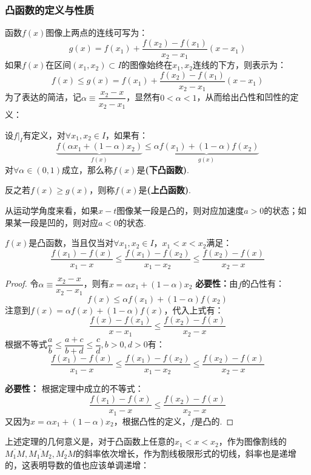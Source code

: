 \subsubsection{凸函数的定义与性质}
函数$f(x)$图像上两点的连线可写为：
\[g(x) = f(x_1) + \frac{f(x_2)-f(x_1)}{x_2-x_1}(x-x_1)\]
如果$f(x)$在区间$(x_1,x_2)\subset I$的图像始终在$x_1,x_2$连线的下方，则表示为：
\[f(x) \leqslant g(x) = f(x_1) + \frac{f(x_2)-f(x_1)}{x_2-x_1}(x-x_1)\]
为了表达的简洁，记$\alpha \equiv \dfrac{x_2-x}{x_2-x_1}$，显然有$0<\alpha<1$，从而给出凸性和凹性的定义：
\begin{definition}
    设$\left.f\right|_{I}$有定义，对$\forall x_1,x_2 \in I$，如果有：
    \[\underbrace{f(\alpha x_1 + (1-\alpha)x_2)}_{f(x)} \leqslant \underbrace{\alpha f(x_1) + (1-\alpha)f(x_2)}_{g(x)}\]
    对$\forall \alpha \in (0,1)$成立，那么称$f(x)$是\textbf{(下凸函数)}.

    反之若$f(x)\geqslant g(x)$，则称$f(x)$是\textbf{(上凸函数)}.
\end{definition}
从运动学角度来看，如果$x-t$图像某一段是凸的，则对应加速度$a>0$的状态；如果某一段是凹的，则对应$a<0$的状态.

\begin{theorem}
    $f(x)$是凸函数，当且仅当对$\forall x_1,x_2 \in I$，$x_1<x<x_2$满足：
    \[\frac{f(x_1)-f(x)}{x_1-x} \leqslant \frac{f(x_1)-f(x_2)}{x_1-x_2} \leqslant \frac{f(x_2)-f(x)}{x_2-x}\]
\end{theorem}

\begin{proof}
    令$\alpha \equiv \dfrac{x_2-x}{x_2-x_1}$，则有$x=\alpha x_1 + (1-\alpha)x_2$
    \textbf{必要性：}由$f$的凸性有：
    \[f(x) \leqslant \alpha f(x_1) + (1-\alpha)f(x_2)\]
    注意到$f(x) = \alpha f(x) + (1-\alpha) f(x)$，代入上式有：
    \[\frac{f(x)-f(x_1)}{x-x_1} \leqslant \frac{f(x_2)-f(x)}{x_2-x}\]
    根据不等式$\dfrac{a}{b} \leqslant \dfrac{a+c}{b+d} \leqslant \dfrac{c}{d},b>0,d>0$有：
    \[\frac{f(x_1)-f(x)}{x_1-x} \leqslant \frac{f(x_1)-f(x_2)}{x_1-x_2} \leqslant \frac{f(x_2)-f(x)}{x_2-x}\]

    \textbf{必要性：}
    根据定理中成立的不等式：
    \[\frac{f(x_1)-f(x)}{x_1-x} \leqslant \frac{f(x_2)-f(x)}{x_2-x}\]
    又因为$x=\alpha x_1 + (1-\alpha)x_2$，根据凸性的定义，$f$是凸的.
\end{proof}

上述定理的几何意义是，对于凸函数上任意的$x_1<x<x_2$，作为图像割线的$\overline{M_1M},\overline{M_1M_2},\overline{M_2M}$的斜率依次增长，作为割线极限形式的切线，斜率也是递增的，这表明导数的值也应该单调递增：

